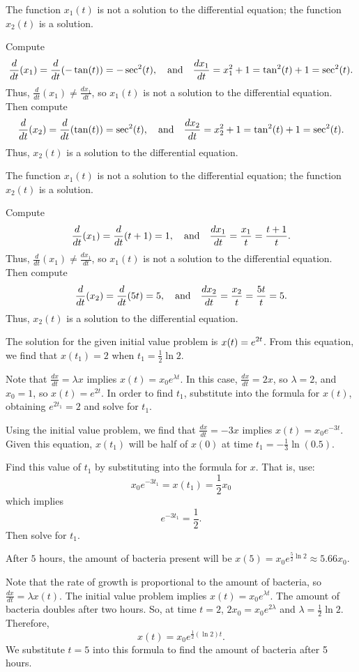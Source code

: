 \documentclass{ximera}
\begin{document}
\ans The function $x_1(t)$ is not a solution to the differential equation;
the function $x_2(t)$ is a solution.

\soln Compute
\[
\frac{d}{dt}(x_1) = \frac{d}{dt}(-\tan(t)) = -\sec^2(t), \quad\mbox{and}\quad
\frac{dx_1}{dt} = x_1^2 + 1 = \tan^2(t) + 1 = \sec^2(t).
\]
Thus, $\frac{d}{dt}(x_1) \neq \frac{dx_1}{dt}$, so $x_1(t)$ is not a
solution to the differential equation.  Then compute
\[
\frac{d}{dt}(x_2) = \frac{d}{dt}(\tan(t)) = \sec^2(t), \quad\mbox{and}\quad
\frac{dx_2}{dt} = x_2^2 + 1 = \tan^2(t) + 1 = \sec^2(t).
\]
Thus, $x_2(t)$ is a solution to the differential equation. 

\ans The function $x_1(t)$ is not a solution to the differential equation;
the function $x_2(t)$ is a solution.

\soln Compute
\[
\frac{d}{dt}(x_1) = \frac{d}{dt}(t + 1) = 1, \quad\mbox{and}\quad
\frac{dx_1}{dt} = \frac{x_1}{t} = \frac{t + 1}{t}.
\]
Thus, $\frac{d}{dt}(x_1) \neq \frac{dx_1}{dt}$, so $x_1(t)$ is not a
solution to the differential equation.  Then compute
\[
\frac{d}{dt}(x_2) = \frac{d}{dt}(5t) = 5, \quad\mbox{and}\quad
\frac{dx_2}{dt} = \frac{x_2}{t} = \frac{5t}{t} = 5.
\]
Thus, $x_2(t)$ is a solution to the differential equation.

\ans The solution for the given initial value problem is
$\displaystyle x(t) = e^{2t}$.  From this equation, we find that $x(t_1) = 2$
when $t_1 = \frac{1}{2}\ln 2$.

\soln Note that $\frac{dx}{dt} = \lambda x$ implies $x(t) =
x_0e^{\lambda t}$.  In this case, $\frac{dx}{dt} = 2x$, so
$\lambda = 2$, and $x_0 = 1$, so $x(t) = e^{2t}$.  In order to
find $t_1$, substitute into the formula for $x(t)$, obtaining
$e^{2t_1} = 2$ and solve for $t_1$.

\ans Using the initial value problem, we find that $\frac{dx}{dt} = -3x$
implies $x(t) = x_0e^{-3t}$.  Given this equation, $x(t_1)$ will be half
of $x(0)$ at time $t_1 = -\frac{1}{3} \ln(0.5)$.

\soln Find this value of $t_1$ by substituting into the formula for $x$. 
That is, use:
\[
x_0e^{-3t_1} = x(t_1) = \frac{1}{2}x_0
\]
which implies
\[ e^{-3t_1} = \frac{1}{2}. \]
Then solve for $t_1$.

\ans After $5$ hours, the amount of bacteria present will be
$x(5) = x_0e^{\frac{5}{2} \ln 2} \approx 5.66x_0$.

\soln Note that the rate of growth is proportional to the amount of
bacteria, so $\frac{dx}{dt} = \lambda x(t)$.  The initial value problem
implies $x(t) = x_0e^{\lambda t}$.  The amount of bacteria doubles after
two hours.  So, at time $t = 2$, $2x_0 = x_0e^{2\lambda}$ and
$\lambda = \frac{1}{2} \ln 2$.  Therefore,
\[ x(t) = x_0e^{\frac{1}{2} (\ln 2)t}. \]
We substitute $t = 5$ into this formula to find the amount of
bacteria after 5 hours.
\end{document}
